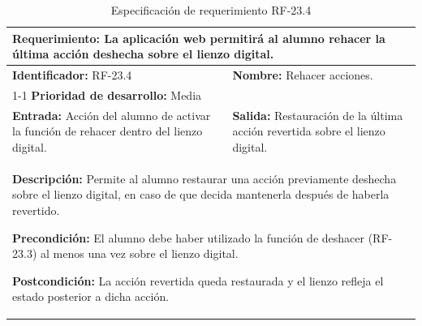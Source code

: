 \begin{table}[H]
\caption{Especificación de requerimiento RF-23.4}
\centering
\renewcommand{\arraystretch}{1.3}
\setlength{\tabcolsep}{6pt}
\begin{tabular}{|p{7cm}|p{8cm}|}
\hline
\multicolumn{2}{|p{15cm}|}{\textbf{Requerimiento:} La aplicación web permitirá al alumno rehacer la última acción deshecha sobre el lienzo digital.} \\ \hline
\textbf{Identificador:} RF-23.4 &
\textbf{Nombre:} Rehacer acciones. \\ \cline{1-1}
\textbf{Prioridad de desarrollo:} Media &
\multicolumn{1}{p{8cm}|}{} \\ \hline
\textbf{Entrada:} Acción del alumno de activar la función de rehacer dentro del lienzo digital. &
\textbf{Salida:} Restauración de la última acción revertida sobre el lienzo digital. \\ \hline
\multicolumn{2}{|p{15cm}|}{
\textbf{Descripción:} Permite al alumno restaurar una acción previamente deshecha sobre el lienzo digital, en caso de que decida mantenerla después de haberla revertido.

\vspace{0.2cm}
\textbf{Precondición:} El alumno debe haber utilizado la función de deshacer (RF-23.3) al menos una vez sobre el lienzo digital.

\vspace{0.2cm}
\textbf{Postcondición:} La acción revertida queda restaurada y el lienzo refleja el estado posterior a dicha acción.
} \\ \hline
\end{tabular}
\label{tab:rf23_4}
\end{table}

